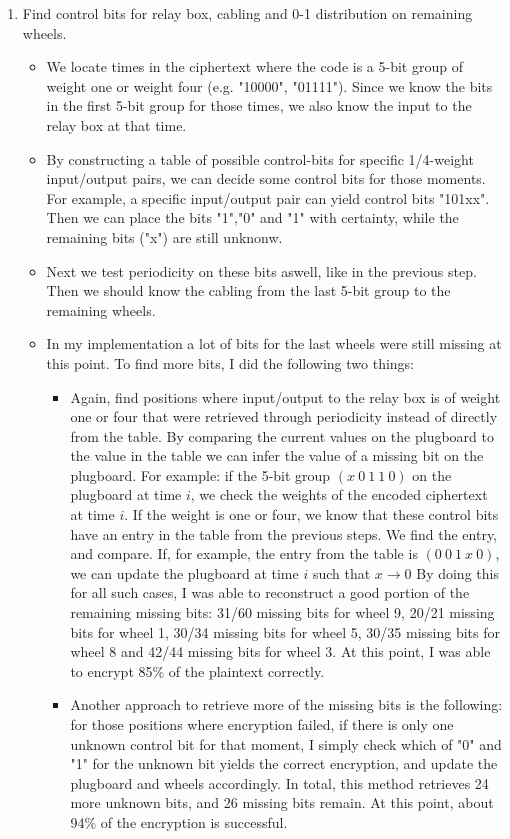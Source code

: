 \documentclass{article}
\begin{document}
\begin{enumerate}
\begin{itemize}
    \end{itemize}
    \item Find control bits for relay box, cabling and 0-1 distribution on remaining wheels.
    \begin{itemize}
        \item We locate times in the ciphertext where the code is a 5-bit group of weight one or weight four (e.g. "10000", "01111").
        Since we know the bits in the first 5-bit group for those times, we also know the input to the relay box at that time.
        \item By constructing a table of possible control-bits for specific 1/4-weight input/output pairs,
        we can decide some control bits for those moments. For example, a specific input/output pair can yield 
        control bits "101xx". Then we can place the bits "1","0" and "1" with certainty, while the remaining bits ("x") are still unknonw.
        \item Next we test periodicity on these bits aswell, like in the previous step. 
        Then we should know the cabling from the last 5-bit group to the remaining wheels.
        \item In my implementation a lot of bits for the last wheels were still missing at this point.
        To find more bits, I did the following two things:
        \begin{itemize}
            \item Again, find positions where input/output to the relay box is of weight one or four that were retrieved through 
            periodicity instead of directly from the table. By comparing the current values on the plugboard to the value in the table
            we can infer the value of a missing bit on the plugboard. For example: if the 5-bit group $(x\ 0\ 1\ 1\ 0)$
            on the plugboard at time $i$, we check the weights of the encoded ciphertext at time $i$. If the weight is one or four,
            we know that these control bits have an entry in the table from the previous steps. We find the entry, and compare.
            If, for example, the entry from the table is $(0\ 0\ 1\ x\ 0)$, we can update the plugboard at time $i$ such that $x \rightarrow 0$
            By doing this for all such cases, I was able to reconstruct a good portion of the remaining missing bits: 
            31/60 missing bits for wheel 9, 20/21 missing bits for wheel 1, 30/34 missing bits for wheel 5, 30/35 missing bits for wheel 8 and 42/44 missing bits for wheel 3.
            At this point, I was able to encrypt 85$\%$ of the plaintext correctly.
            \item Another approach to retrieve more of the missing bits is the following: for those positions where encryption failed,
            if there is only one unknown control bit for that moment, I simply check which of "0" and "1" for the unknown bit yields the correct encryption, and update the plugboard and wheels accordingly.
            In total, this method retrieves 24 more unknown bits, and 26 missing bits remain.
            At this point, about 94$\%$ of the encryption is successful.
        \end{itemize}


\end{itemize}
\end{enumerate}
\end{document}
